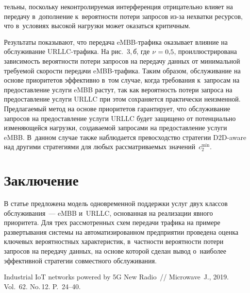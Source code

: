 \begin{multicols}{2}
\pagebreak

\noindent
тельны, поскольку 
не\-конт\-ро\-ли\-ру\-емая интерференция отрицательно влияет на передачу в~дополнение 
к~ве\-ро\-ят\-ности потери запросов из-за нехватки ресурсов, что в~условиях высокой 
на\-груз\-ки может оказаться критичным.



Результаты показывают, что передача eMBB-тра\-фи\-ка оказывает влияние на 
обслуживание URLLC-тра\-фи\-ка. На рис.~3,\,\textit{б}, где $\nu \hm= 0{,}5$, 
проиллюстрирована за\-ви\-си\-мость ве\-ро\-ят\-ности потери запросов на передачу данных от 
минимальной тре\-бу\-емой ско\-рости передачи \mbox{eMBB}-тра\-фи\-ка. Таким образом, 
обслуживание на основе приоритетов эффективно в~том случае, когда требования 
к~запросам на предостав\-ле\-ние услуги \mbox{eMBB} растут, так как вероятность потери 
запроса на предостав\-ле\-ние услуги \mbox{URLLC} при этом сохраняется практически 
неизменной. Предлагаемый метод на основе приоритетов гарантирует, что 
обслуживание запросов на предостав\-ле\-ние услуги \mbox{URLLC} будет защищено от 
потенциально из\-ме\-ня\-юще\-йся нагрузки, создаваемой запросами на предостав\-ле\-ние 
услуги \mbox{eMBB}. В~данном случае также наблюдается 
превосходство стратегии D2D-aware над другими стратегиями для любых 
рас\-смат\-ри\-ва\-емых значений~$c_{2}^{\min}$.

\vspace*{-6pt}

\section{Заключение}

\vspace*{-3pt}

В статье предложена модель одновременной поддержки услуг двух классов 
обслуживания~--- \mbox{eMBB} и~\mbox{URLLC}, основанная на реализации явного приоритета. Для 
трех рассмотренных схем передачи трафика на примере развертывания сис\-те\-мы на 
автоматизированном предприятии проведена оценка ключевых вероятностных 
характеристик, в~част\-ности вероятности потери запросов на передачу данных, на 
основе которой сделан вывод о~наиболее эффективной стратегии совместного 
обслуживания.

{\small\frenchspacing
 {\baselineskip=10.6pt
 \begin{thebibliography}{99}
 Industrial IoT networks powered by 5G 
New Radio~// Microwave~J., 2019. Vol.~62. No.\,12. P.~24--40.


\end{thebibliography}}}
\end{multicols}
